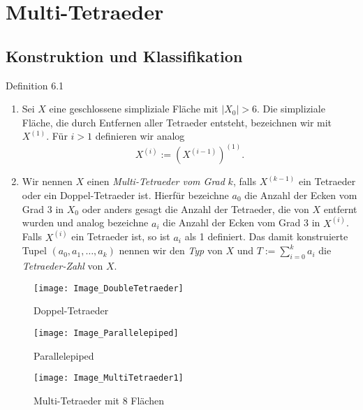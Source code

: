 \documentclass{beamer}
\begin{document}
\section{Multi-Tetraeder}
\subsection{Konstruktion und Klassifikation}
\begin{frame}
\begin{block}{Definition 6.1}
\begin{enumerate}
\item Sei $X$ eine geschlossene simpliziale Fläche mit $\vert X_0\vert > 6.$
 Die simpliziale Fläche, die durch Entfernen aller Tetraeder entsteht, bezeichnen wir mit $X^{(1)}$. Für $i>1$ definieren wir analog 
\[
X^{(i)}:=(X^{(i-1)})^{(1)}.
\]
\item Wir nennen $X$ einen \emph{Multi-Tetraeder vom Grad} $k$, falls $X^{(k-1)}$ ein Tetraeder oder ein Doppel-Tetraeder ist. Hierfür bezeichne $a_0$ die Anzahl der Ecken vom Grad 3 in $X_0$ oder anders gesagt die Anzahl der Tetraeder, die von $X$ entfernt wurden und analog bezeichne $a_i$ die Anzahl der Ecken vom Grad 3 in $X^{(i)}$. Falls $X^{(i)}$ ein Tetraeder ist, so ist $a_i$ als 1 definiert. Das damit konstruierte Tupel $(a_0,a_1,\ldots,a_k)$ nennen wir den \emph{Typ} von $X$ und $T:=\sum_{i=0}^{k} a_i$ die \emph{Tetraeder-Zahl} von $X$.\\
\end{enumerate}
\end{block}
\end{frame}
\begin{frame}
\begin{figure}[H]
\begin{center}
\texttt{[image: Image\_DoubleTetraeder]}
\end{center}
\caption{Doppel-Tetraeder}
\end{figure}
\end{frame}
\begin{frame}
\begin{figure}[H]
\begin{center}
\texttt{[image: Image\_Parallelepiped]}
\end{center}
\caption{Parallelepiped}
\end{figure}
\end{frame}
\begin{figure}[H]
\begin{center}
\texttt{[image: Image\_MultiTetraeder1]}
\end{center}
\caption{Multi-Tetraeder mit 8 Flächen}
\end{figure}
\end{document}
